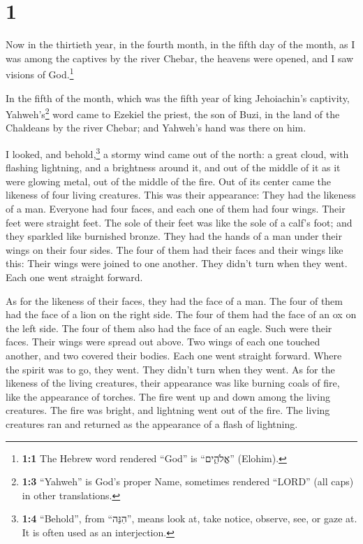 \hypertarget{section}{%
\section{1}\label{section}}

 Now in the thirtieth year, in the fourth month, in the
fifth day of the month, as I was among the captives by the river Chebar,
the heavens were opened, and I saw visions of God.\footnote{\textbf{1:1}
  The Hebrew word rendered ``God'' is ``אֱלֹהִ֑ים'' (Elohim).}

 In the fifth of the month, which was the fifth year of
king Jehoiachin's captivity,  Yahweh's\footnote{\textbf{1:3}
  ``Yahweh'' is God's proper Name, sometimes rendered ``LORD'' (all
  caps) in other translations.} word came to Ezekiel the priest, the son
of Buzi, in the land of the Chaldeans by the river Chebar; and Yahweh's
hand was there on him.

 I looked, and behold,\footnote{\textbf{1:4} ``Behold'',
  from ``הִנֵּה'', means look at, take notice, observe, see, or gaze at.
  It is often used as an interjection.} a stormy wind came out of the
north: a great cloud, with flashing lightning, and a brightness around
it, and out of the middle of it as it were glowing metal, out of the
middle of the fire.  Out of its center came the likeness
of four living creatures. This was their appearance: They had the
likeness of a man.  Everyone had four faces, and each one
of them had four wings.  Their feet were straight feet.
The sole of their feet was like the sole of a calf's foot; and they
sparkled like burnished bronze.  They had the hands of a
man under their wings on their four sides. The four of them had their
faces and their wings like this:  Their wings were joined
to one another. They didn't turn when they went. Each one went straight
forward.

 As for the likeness of their faces, they had the face of
a man. The four of them had the face of a lion on the right side. The
four of them had the face of an ox on the left side. The four of them
also had the face of an eagle.  Such were their faces.
Their wings were spread out above. Two wings of each one touched
another, and two covered their bodies.  Each one went
straight forward. Where the spirit was to go, they went. They didn't
turn when they went.  As for the likeness of the living
creatures, their appearance was like burning coals of fire, like the
appearance of torches. The fire went up and down among the living
creatures. The fire was bright, and lightning went out of the fire.
 The living creatures ran and returned as the appearance
of a flash of lightning.

